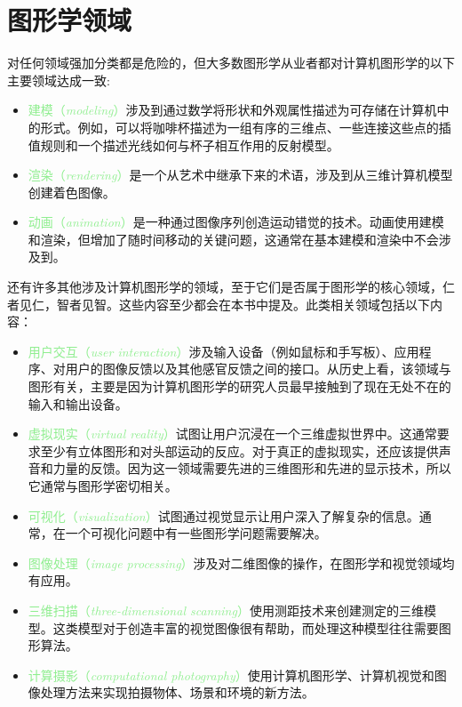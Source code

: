 \documentclass[lang=cn,12pt,marginpar=margintrue]{elegantbook}
\begin{document}
\section{图形学领域}

对任何领域强加分类都是危险的，但大多数图形学从业者都对计算机图形学的以下主要领域达成一致:
\begin{itemize}
  \item \textcolor{lightgreen}{建模（\textit{modeling}）}涉及到通过数学将形状和外观属性描述为可存储在计算机中的形式。例如，可以将咖啡杯描述为一组有序的三维点、一些连接这些点的插值规则和一个描述光线如何与杯子相互作用的反射模型。
  \item \textcolor{lightgreen}{渲染（\textit{rendering}）}是一个从艺术中继承下来的术语，涉及到从三维计算机模型创建着色图像。
  \item \textcolor{lightgreen}{动画（\textit{animation}）}是一种通过图像序列创造运动错觉的技术。动画使用建模和渲染，但增加了随时间移动的关键问题，这通常在基本建模和渲染中不会涉及到。
\end{itemize}
还有许多其他涉及计算机图形学的领域，至于它们是否属于图形学的核心领域，仁者见仁，智者见智。这些内容至少都会在本书中提及。此类相关领域包括以下内容：
\begin{itemize}
  \item \textcolor{lightgreen}{用户交互（\textit{user interaction}）}涉及输入设备（例如鼠标和手写板）、应用程序、对用户的图像反馈以及其他感官反馈之间的接口。从历史上看，该领域与图形有关，主要是因为计算机图形学的研究人员最早接触到了现在无处不在的输入和输出设备。
  \item \textcolor{lightgreen}{虚拟现实（\textit{virtual reality}）}试图让用户沉浸在一个三维虚拟世界中。这通常要求至少有立体图形和对头部运动的反应。对于真正的虚拟现实，还应该提供声音和力量的反馈。因为这一领域需要先进的三维图形和先进的显示技术，所以它通常与图形学密切相关。
  \item \textcolor{lightgreen}{可视化（\textit{visualization}）}试图通过视觉显示让用户深入了解复杂的信息。通常，在一个可视化问题中有一些图形学问题需要解决。
  \item \textcolor{lightgreen}{图像处理（\textit{image processing}）}涉及对二维图像的操作，在图形学和视觉领域均有应用。
  \item \textcolor{lightgreen}{三维扫描（\textit{three-dimensional scanning}）}使用测距技术来创建测定的三维模型。这类模型对于创造丰富的视觉图像很有帮助，而处理这种模型往往需要图形算法。
  \item \textcolor{lightgreen}{计算摄影（\textit{computational photography}）}使用计算机图形学、计算机视觉和图像处理方法来实现拍摄物体、场景和环境的新方法。
\end{itemize}
\end{document}
